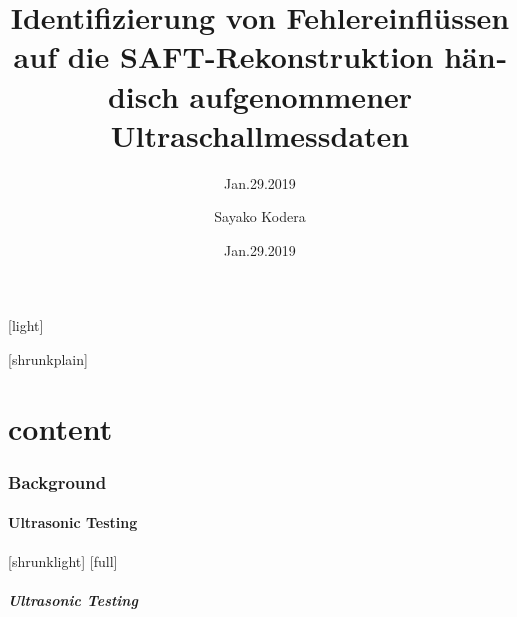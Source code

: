 \documentclass[12pt,compress,aspectratio=169]{beamer} %
\title{\foreignlanguage{german}{Identifizierung von Fehlereinflüssen auf die SAFT-Rekonstruktion händisch aufgenommener Ultraschallmessdaten}} \subtitle{Jan.29.2019}
\institute{\foreignlanguage{german}{Technische Universität Ilmenau}}
\author{Sayako Kodera}
\date{Jan.29.2019}
\begin{document}
[light]
\begin{frame}[noframenumbering] %
 	\titlepage
\end{frame}

[shrunkplain]

\part{content}

\section{Background}

\subsection{Ultrasonic Testing}
[shrunklight]
[full]
\begin{frame}[c]
	\frametitle{Ultrasonic Testing}
	\centering	
		
\end{frame}
\end{document}
